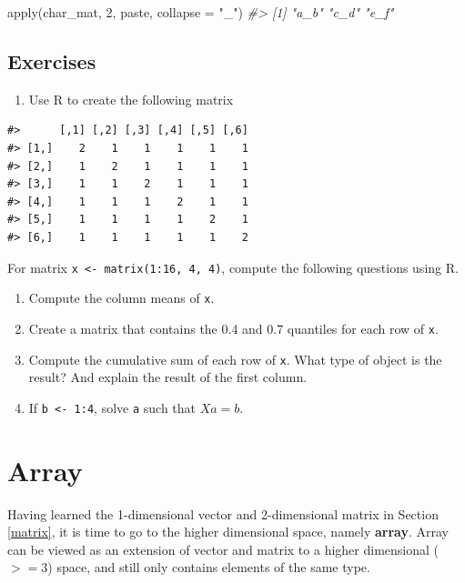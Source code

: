 \documentclass[
]{book}
\newenvironment{Shaded}{\begin{snugshade}}{\end{snugshade}}
\newcommand{\AttributeTok}[1]{\textcolor[rgb]{0.77,0.63,0.00}{#1}}
\newcommand{\CommentTok}[1]{\textcolor[rgb]{0.56,0.35,0.01}{\textit{#1}}}
\newcommand{\DecValTok}[1]{\textcolor[rgb]{0.00,0.00,0.81}{#1}}
\newcommand{\FunctionTok}[1]{\textcolor[rgb]{0.00,0.00,0.00}{#1}}
\newcommand{\NormalTok}[1]{#1}
\newcommand{\StringTok}[1]{\textcolor[rgb]{0.31,0.60,0.02}{#1}}
\providecommand{\tightlist}{%
  \setlength{\itemsep}{0pt}\setlength{\parskip}{0pt}}
\begin{document}
\begin{Shaded}
\begin{Highlighting}[]
\FunctionTok{apply}\NormalTok{(char\_mat, }\DecValTok{2}\NormalTok{, paste, }\AttributeTok{collapse =} \StringTok{"\_"}\NormalTok{)}
\CommentTok{\#\textgreater{} [1] "a\_b" "c\_d" "e\_f"}
\end{Highlighting}
\end{Shaded}

\hypertarget{exercises-14}{%
\subsection{Exercises}\label{exercises-14}}

\begin{enumerate}
\def\labelenumi{\arabic{enumi}.}
\tightlist
\item
  Use R to create the following matrix
\end{enumerate}

\begin{verbatim}
#>      [,1] [,2] [,3] [,4] [,5] [,6]
#> [1,]    2    1    1    1    1    1
#> [2,]    1    2    1    1    1    1
#> [3,]    1    1    2    1    1    1
#> [4,]    1    1    1    2    1    1
#> [5,]    1    1    1    1    2    1
#> [6,]    1    1    1    1    1    2
\end{verbatim}

For matrix \texttt{x\ \textless{}-\ matrix(1:16,\ 4,\ 4)}, compute the following questions using R.

\begin{enumerate}
\def\labelenumi{\arabic{enumi}.}
\setcounter{enumi}{1}
\item
  Compute the column means of \texttt{x}.
\item
  Create a matrix that contains the 0.4 and 0.7 quantiles for each row of \texttt{x}.
\item
  Compute the cumulative sum of each row of \texttt{x}. What type of object is the result? And explain the result of the first column.
\item
  If \texttt{b\ \textless{}-\ 1:4}, solve \texttt{a} such that \(Xa = b\).
\end{enumerate}

\hypertarget{array}{%
\section{Array}\label{array}}

Having learned the 1-dimensional vector and 2-dimensional matrix in Section \ref{matrix}, it is time to go to the higher dimensional space, namely \textbf{array}. Array can be viewed as an extension of vector and matrix to a higher dimensional (\(>=3\)) space, and still only contains elements of the same type.
\end{document}
